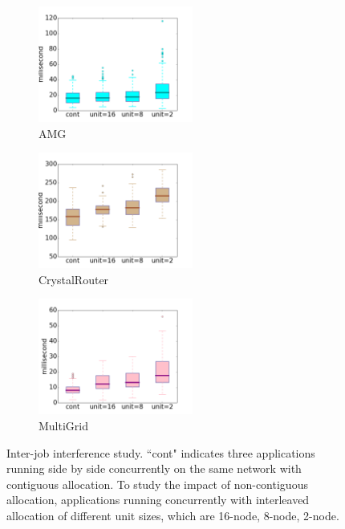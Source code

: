 \documentclass[conference]{IEEEtran}
\begin{document}
\begin{figure}[t!]
    \centering
    \begin{subfigure}[t]{0.32\textwidth}
        \centering
        \includegraphics[height=1.5in]{figs/inter-job/amg}
        \caption{AMG}
        \label{fig:interjob-amg-box}
    \end{subfigure}%
    \hspace{1em}%
    \begin{subfigure}[t]{0.32\textwidth}
        \centering
        \includegraphics[height=1.5in]{figs/inter-job/cr}
        \caption{CrystalRouter}
        \label{fig:interjob-cr-box}
    \end{subfigure}%
    \begin{subfigure}[t]{0.32\textwidth}
        \centering
        \includegraphics[height=1.5in]{figs/inter-job/mg}
        \caption{MultiGrid}
        \label{fig:interjob-mg-box}
    \end{subfigure}%
   \caption{Inter-job interference study. ``cont" indicates three applications running side by side concurrently on the same network with contiguous allocation. To study the impact of non-contiguous allocation, applications running concurrently with interleaved allocation of different unit sizes, which are 16-node, 8-node, 2-node. }
   \label{fig: 3apps interjob study}
\end{figure}
\end{document}
